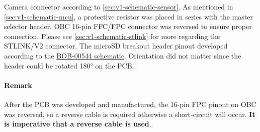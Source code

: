 Camera connector according to \autoref{sec:v1-schematic-sensor}.
\nl
As mentioned in \autoref{sec:v1-schematic-mcu}, a protective resistor was placed in series with the master selector header. OBC 16-pin FFC/FPC connector was reversed to ensure proper connection.
\nl
Please see \autoref{sec:v1-schematic-stlink} for more regarding the STLINK/V2 connector.
\nl
The microSD breakout header pinout developed according to the \href{https://core-electronics.com.au/attachments/localcontent/microSD-Breakout-v14_8139a6ca52.pdf}{BOB-00544 schematic}. Orientation did not matter since the header could be rotated 180° on the PCB.

\paragraph{Remark}
After the PCB was developed and manufactured, the 16-pin FPC pinout on OBC was reversed, so a reverse cable is required otherwise a short-circuit will occur.
\textbf{It is imperative that a reverse cable is used}.